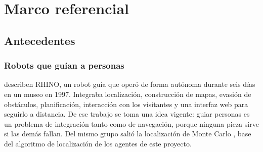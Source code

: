 %
%
\chapter{Marco referencial}
\label{cap:marco}

\section{Antecedentes}
\label{sec:antecedentes}

\subsection{Robots que guían a personas}

\textcite{burgard1999experiences} describen RHINO, un robot guía que operó de
forma autónoma durante seis días en un museo en 1997. Integraba localización,
construcción de mapas, evasión de obstáculos, planificación, interacción con los
visitantes y una interfaz web para seguirlo a distancia. De ese trabajo se toma
una idea vigente: guiar personas es un problema de integración tanto como de
navegación, porque ninguna pieza sirve si las demás fallan. Del mismo grupo salió
la localización de Monte Carlo \autocite{fox1999monte}, base del algoritmo de
localización de los agentes de este proyecto.

